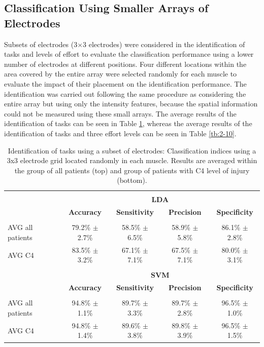 \subsection{Classification Using Smaller Arrays of Electrodes}
Subsets of electrodes (3$\times$3 electrodes) were considered in the identification of tasks and levels of effort to evaluate the classification performance using a lower number of electrodes at different positions. Four different locations within the area covered by the entire array were selected randomly for each muscle to evaluate the impact of their placement on the identification performance. The identification was carried out following the same procedure as considering the entire array but using only the intensity features, because the spatial information could not be measured using these small arrays. The average results of the identification of tasks can be seen in Table \ref{2-9}, whereas the average results of the identification of tasks and three effort levels can be seen in Table \ref{tb:2-10}.

\begin{table}[]
\centering
\caption{Identification of tasks using a subset of electrodes: Classification indices using a 3x3 electrode grid located randomly in each muscle. Results are averaged within the group of all patients (top) and group of patients with C4 level of injury (bottom).}
\label{2-9}
\begin{tabular}{lcccc}
 & & & &\\
                 & \multicolumn{4}{c}{\large{\textbf{LDA}}}                                                      \\
                 & \textbf{Accuracy}  & \textbf{Sensitivity} & \textbf{Precision} & \textbf{Specificity} \\ \hline
                 &                    &                      &                    &                      \\
AVG all patients & 79.2\% $\pm$ 2.7\% & 58.5\% $\pm$ 6.5\%   & 58.9\% $\pm$ 5.8\% & 86.1\% $\pm$ 2.8\%   \\
AVG C4           & 83.5\% $\pm$ 3.2\% & 67.1\% $\pm$ 7.1\%   & 67.5\% $\pm$ 7.1\% & 80.0\% $\pm$ 3.1\%   \\
                 &                    &                      &                    &                      \\
                 & \multicolumn{4}{c}{\large{\textbf{SVM}}}                                                      \\
                 & \textbf{Accuracy}  & \textbf{Sensitivity} & \textbf{Precision} & \textbf{Specificity} \\ \hline
                 &                    &                      &                    &                      \\
AVG all patients & 94.8\% $\pm$ 1.1\% & 89.7\% $\pm$ 3.3\%   & 89.7\% $\pm$ 2.8\% & 96.5\% $\pm$ 1.0\%   \\
AVG C4           & 94.8\% $\pm$ 1.4\% & 89.6\% $\pm$ 3.8\%   & 89.8\% $\pm$ 3.9\% & 96.5\% $\pm$ 1.5\%  
\end{tabular}
\end{table}

